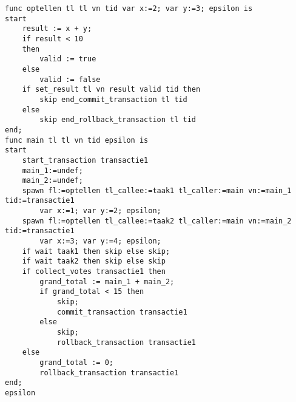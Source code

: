 \begin{lstlisting}[caption={Commit}]
func optellen tl tl vn tid var x:=2; var y:=3; epsilon is
start
	result := x + y;
	if result < 10
	then
		valid := true
	else
		valid := false
	if set_result tl vn result valid tid then
		skip end_commit_transaction tl tid
	else
		skip end_rollback_transaction tl tid
end;
func main tl tl vn tid epsilon is
start
	start_transaction transactie1
	main_1:=undef;
	main_2:=undef;
	spawn fl:=optellen tl_callee:=taak1 tl_caller:=main vn:=main_1 tid:=transactie1
		var x:=1; var y:=2; epsilon;
	spawn fl:=optellen tl_callee:=taak2 tl_caller:=main vn:=main_2 tid:=transactie1
		var x:=3; var y:=4; epsilon;
	if wait taak1 then skip else skip;
	if wait taak2 then skip else skip
	if collect_votes transactie1 then
		grand_total := main_1 + main_2;
		if grand_total < 15 then
			skip;
			commit_transaction transactie1
		else
			skip;
			rollback_transaction transactie1
	else
		grand_total := 0;
		rollback_transaction transactie1
end;
epsilon
\end{lstlisting}

